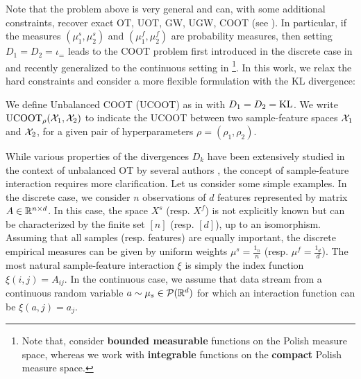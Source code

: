 Note that the problem above is very general and can, with some additional
constraints, recover exact OT, UOT, GW, UGW, COOT (see ).
In particular, if the measures $(\mu^s_1, \mu^s_2)$ and $(\mu^f_1, \mu^f_2)$
are probability measures, then setting $D_1 = D_2 = \iota_=$ leads to the
COOT problem first introduced in the discrete case in \citep{Redko20} and
recently generalized to the continuous setting in \citep{Chowdhury21b}
\footnote{Note that, \citet{Chowdhury21b} consider \textbf{bounded measurable} functions
on the Polish measure space, whereas we work with \textbf{integrable} functions
on the \textbf{compact} Polish measure space.}.
In this work, we relax the hard constraints and consider a more flexible formulation
with the KL divergence:
\begin{definition}[UCOOT]
   We define Unbalanced COOT (UCOOT) as in  with $D_1 = D_2 = \text{KL}$.
   We write $\text{UCOOT}_{\rho}(\mathcal X_1, \mathcal X_2)$ to indicate the UCOOT between
   two sample-feature spaces $\mathcal X_1$ and $\mathcal X_2$, for a given
   pair of hyperparameters $\rho = (\rho_1, \rho_2)$.
\end{definition}
While various properties of the divergences $D_k$ have been extensively studied
in the context of unbalanced OT by several authors \citep{Chizat17,Frogner15},
the concept of sample-feature interaction requires more clarification.
Let us consider some simple examples.
In the discrete case, we consider $n$ observations of $d$ features
represented by matrix $A \in \mathbb R^{n \times d}$. In this case, the space $X^s$ (resp. $X^f$)
is not explicitly known but can be characterized by the finite set $[n]$ (resp. $[d]$),
up to an isomorphism. Assuming that all samples (resp. features) are equally important,
the discrete empirical measures can be given by uniform weights $\mu^s = \frac{1_{n}}{n}$
(resp. $\mu^f = \frac{1_{d}}{d}$). The most natural sample-feature interaction $\xi$ is simply
the index function $\xi(i, j) = A_{ij}$. In the continuous case,
we assume that data stream from a continuous random variable $a \sim \mu_s \in \mathcal P(\mathbb R^d)$
for which an interaction function can be $\xi(a, j) = a_j$.
